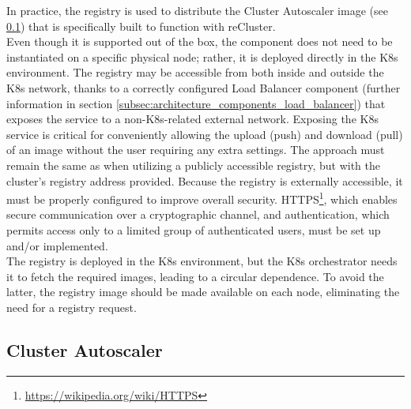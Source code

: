 In practice, the registry is used to distribute the Cluster Autoscaler image (see
\ref{subsec:architecture_components_cluster_autoscaler}) that is specifically built
to function with reCluster. \\ %
Even though it is supported out of the box, the component does not need to be
instantiated on a specific physical node; rather, it is deployed directly in the
K8s environment. The registry may be accessible from both inside and outside the
K8s network, thanks to a correctly configured Load Balancer component (further information
in section \ref{subsec:architecture_components_load_balancer}) that exposes the
service to a non-K8s-related external network. Exposing the K8s service is critical
for conveniently allowing the upload (push) and download (pull) of an image without
the user requiring any extra settings. The approach must remain the same as when
utilizing a publicly accessible registry, but with the cluster's registry address
provided. Because the registry is externally accessible, it must be properly configured
to improve overall security. HTTPS\footnote{\url{https://wikipedia.org/wiki/HTTPS}},
which enables secure communication over a cryptographic channel, and
authentication, which permits access only to a limited group of authenticated users,
must be set up and/or implemented. \\ %
The registry is deployed in the K8s environment, but the K8s orchestrator needs it
to fetch the required images, leading to a circular dependence. To avoid the latter,
the registry image should be made available on each node, eliminating the need for
a registry request.

\subsection{Cluster Autoscaler}
\label{subsec:architecture_components_cluster_autoscaler}

